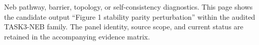 Neb pathway, barrier, topology, or self-consistency diagnostics. This page shows the candidate output ``Figure 1 stability parity perturbation'' within the audited TASK3-NEB family. The panel identity, source scope, and current status are retained in the accompanying evidence matrix.
